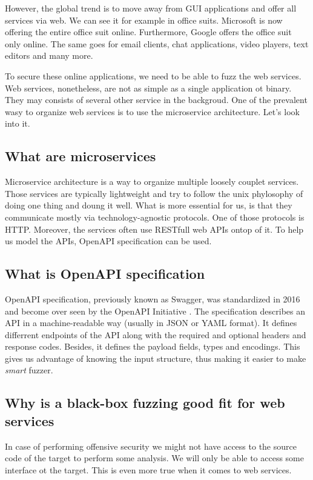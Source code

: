 However, the global trend is to move away from GUI applications and offer all services via web. We can see it for example in office suits. Microsoft is now offering the entire office suit online. Furthermore, Google offers the office suit only online. The same goes for email clients, chat applications, video players, text editors and many more.

To secure these online applications, we need to be able to fuzz the web services. Web services, nonetheless, are not as simple as a single application ot binary. They may consists of several other service in the backgroud. One of the prevalent wasy to organize web services is to use the microservice architecture. Let's look into it.

\subsection{What are microservices}
Microservice architecture is a way to organize multiple loosely couplet services. Those services are typically lightweight and try to follow the unix phylosophy of doing one thing and doung it well. What is more essential for us, is that they communicate mostly via technology-agnostic protocols. One of those protocols is HTTP. Moreover, the services often use RESTfull web APIs ontop of it. To help us model the APIs, OpenAPI specification can be used.

\subsection{What is OpenAPI specification}
OpenAPI specification, previously known as Swagger, was standardized in 2016 and become over seen by the OpenAPI Initiative \cite{openapi2020main}. The specification describes an API in a machine-readable way (usually in JSON or YAML format). It defines differrent endpoints of the API along with the required and optional headers and response codes. Besides, it defines the payload fields, types and encodings. This gives us advantage of knowing the input structure, thus making it easier to make \emph{smart} fuzzer.

\subsection{Why is a black-box fuzzing good fit for web services}
In case of performing offensive security we might not have access to the source code of the target to perform some analysis. We will only be able to access some interface ot the target. This is even more true when it comes to web services.
